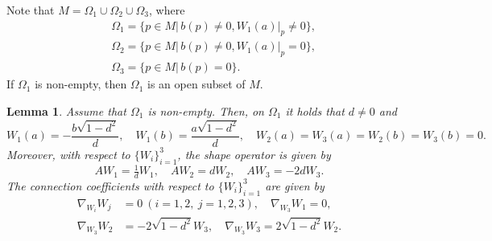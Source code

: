 \documentclass[reqno]{amsart}%
\newtheorem{lemma}[theorem]{Lemma}
\theoremstyle{definition}
\numberwithin{equation}{section}
\begin{document}
	Note that $M=\Omega_1\cup \Omega_2\cup \Omega_3$, where
	\begin{equation*}
		\begin{aligned}
			&\Omega_1=\{p\in M|\, b(p)\neq0, W_1(a)|_p\neq0\},\\
			&\Omega_2=\{p\in M|\, b(p)\neq0, W_1(a)|_p=0\},\\
			&\Omega_3=\{p\in M|\, b(p)=0\}.
		\end{aligned}
	\end{equation*}
	If $\Omega_1$ is non-empty, then $\Omega_1$ is an open subset of $M$.
	\begin{lemma}\label{lem:4.3}
		Assume that $\Omega_1$ is non-empty. 
		Then, on $\Omega_1$ it holds that $d\neq0$
		and
		\begin{equation}\label{eqn:2.18}
			W_1(a)=-\frac{b\sqrt{1-d^2}}{d}, \quad 
			W_1(b)=\frac{a\sqrt{1-d^2}}{d},\quad 
			W_2(a)=W_3(a)
			= W_2(b)=W_3(b)=0.
		\end{equation}
		Moreover, with respect to $\{W_i\}_{i=1}^3$,
		the shape operator is given by
		\begin{equation}\label{eqn:8.20}
			AW_1=\tfrac{1}{d}W_1, \quad AW_2=dW_2, \quad AW_3=-2dW_3.
		\end{equation}
		The connection coefficients with respect to $\{W_i\}_{i=1}^3$ are given by
		\begin{equation}\label{eqn:9.45}
			\begin{aligned}
				\nabla_{W_i}W_j&=0 \ ( i=1, 2, \ j=1, 2, 3), \quad \nabla_{W_3}W_1=0,\\
				\nabla_{W_3}W_2&=-2\sqrt{1-d^2}W_3, \quad
				\nabla_{W_3}W_3=2\sqrt{1-d^2}W_2.
			\end{aligned}
		\end{equation}
	\end{lemma}
	
\end{document}
